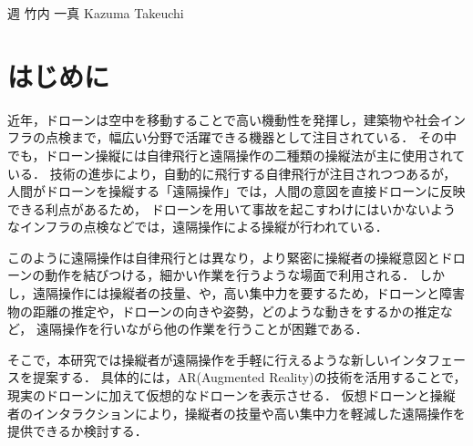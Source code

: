 \documentclass[a4paper,10pt,twocolumn,uplatex]{jsarticle}
\date{9}
\begin{document}
{週}
{竹内 一真}
{Kazuma Takeuchi}

\section{はじめに}
近年，ドローンは空中を移動することで高い機動性を発揮し，建築物や社会インフラの点検まで，幅広い分野で活躍できる機器として注目されている．
その中でも，ドローン操縦には自律飛行と遠隔操作の二種類の操縦法が主に使用されている\cite{sample}．
技術の進歩により，自動的に飛行する自律飛行が注目されつつあるが，人間がドローンを操縦する「遠隔操作」では，人間の意図を直接ドローンに反映できる利点があるため，
ドローンを用いて事故を起こすわけにはいかないようなインフラの点検などでは，遠隔操作による操縦が行われている．
\par
このように遠隔操作は自律飛行とは異なり，より緊密に操縦者の操縦意図とドローンの動作を結びつける，細かい作業を行うような場面で利用される．
しかし，遠隔操作には操縦者の技量、や，高い集中力を要するため，ドローンと障害物の距離の推定や，ドローンの向きや姿勢，どのような動きをするかの推定など，
遠隔操作を行いながら他の作業を行うことが困難である\cite{teleoperate}．
\par
そこで，本研究では操縦者が遠隔操作を手軽に行えるような新しいインタフェースを提案する．
具体的には，AR(Augmented Reality)の技術を活用することで，現実のドローンに加えて仮想的なドローンを表示させる．
仮想ドローンと操縦者のインタラクションにより，操縦者の技量や高い集中力を軽減した遠隔操作を提供できるか検討する．
\par

\end{document}
